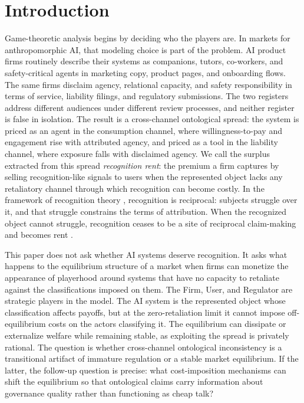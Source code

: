 \section{Introduction}
\label{sec:introduction}

Game-theoretic analysis begins by deciding who the players are. In markets for anthropomorphic AI, that modeling choice is part of the problem. AI product firms routinely describe their systems as companions, tutors, co-workers, and safety-critical agents in marketing copy, product pages, and onboarding flows. The same firms disclaim agency, relational capacity, and safety responsibility in terms of service, liability filings, and regulatory submissions. The two registers address different audiences under different review processes, and neither register is false in isolation. The result is a cross-channel ontological spread: the system is priced as an agent in the consumption channel, where willingness-to-pay and engagement rise with attributed agency, and priced as a tool in the liability channel, where exposure falls with disclaimed agency. We call the surplus extracted from this spread \emph{recognition rent}: the premium a firm captures by selling recognition-like signals to users when the represented object lacks any retaliatory channel through which recognition can become costly. In the framework of recognition theory \citep{honneth1995}, recognition is reciprocal: subjects struggle over it, and that struggle constrains the terms of attribution. When the recognized object cannot struggle, recognition ceases to be a site of reciprocal claim-making and becomes rent \citep{crawford_sobel1982}.

This paper does not ask whether AI systems deserve recognition. It asks what happens to the equilibrium structure of a market when firms can monetize the appearance of playerhood around systems that have no capacity to retaliate against the classifications imposed on them. The Firm, User, and Regulator are strategic players in the model. The AI system is the represented object whose classification affects payoffs, but at the zero-retaliation limit it cannot impose off-equilibrium costs on the actors classifying it. The equilibrium can dissipate or externalize welfare while remaining stable, as exploiting the spread is privately rational. The question is whether cross-channel ontological inconsistency is a transitional artifact of immature regulation or a stable market equilibrium. If the latter, the follow-up question is precise: what cost-imposition mechanisms can shift the equilibrium so that ontological claims carry information about governance quality rather than functioning as cheap talk?

